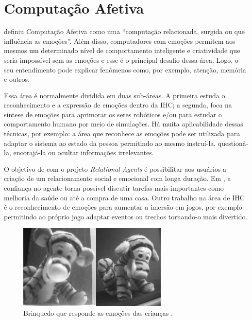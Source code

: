 \section{Computação Afetiva}

\citet{Pic98} definiu Computação Afetiva como uma ``computação relacionada,
surgida ou que influência as emoções''. Além disso, computadores com emoções
permitem aos mesmos um determinado nível de comportamento inteligente e
criatividade que seria impossível sem as emoções e esse é o principal desafio
dessa área. Logo, o seu entendimento pode explicar fenômenos como, por
exemplo, atenção, memória e outros.

Essa área é normalmente dividida em duas sub-áreas. A primeira estuda o
reconhecimento e a expressão de emoções dentro da IHC;
a segunda, foca na síntese de emoções para aprimorar os seres robóticos e/ou
para estudar o comportamento humano por meio de simulações. Há muita
aplicabilidade dessas técnicas, por exemplo: a área que reconhece as emoções
pode ser utilizada para adaptar o sistema ao estado da pessoa permitindo ao
mesmo instruí-la, questioná-la, encorajá-la ou ocultar informações irrelevantes.

O objetivo de \citet{bick2003relational} com o projeto \emph{Relational
Agents} é possibilitar aos usuários a criação de um relacionamento social e
emocional com longa duração.  Em \citet{bickmore2009virtual}, a confiança no
agente torna possível discutir tarefas mais importantes como melhoria da saúde
ou até a compra de uma casa. Outro trabalho na área de IHC é o reconhecimento
de emoções para aumentar a imersão em jogos, por exemplo permitindo ao próprio
jogo adaptar eventos ou trechos tornando-o mais divertido.

\begin{figure}
  \begin{center}
    \includegraphics[width=75mm]{figuras/tigger-mit.png}
  \end{center}
  \caption{Brinquedo que responde as emoções das crianças \cite{kirsch1999affective}.}
  \label{fig:tigger-mit}
\end{figure}

